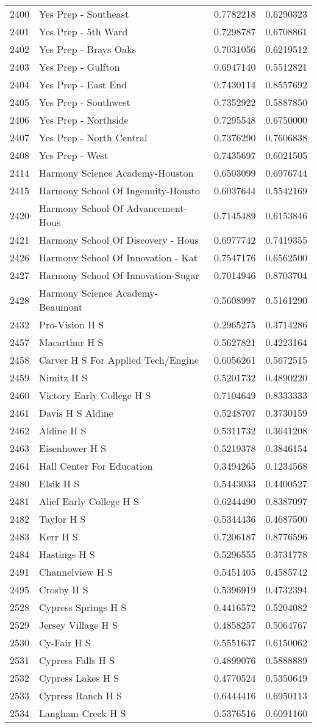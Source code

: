 \documentclass[
]{article}
\begin{document}
\begin{longtable}[]{@{}llrr@{}}
2400 & Yes Prep - Southeast & 0.7782218 & 0.6290323\tabularnewline
2401 & Yes Prep - 5th Ward & 0.7298787 & 0.6708861\tabularnewline
2402 & Yes Prep - Brays Oaks & 0.7031056 & 0.6219512\tabularnewline
2403 & Yes Prep - Gulfton & 0.6947140 & 0.5512821\tabularnewline
2404 & Yes Prep - East End & 0.7430114 & 0.8557692\tabularnewline
2405 & Yes Prep - Southwest & 0.7352922 & 0.5887850\tabularnewline
2406 & Yes Prep - Northside & 0.7295548 & 0.6750000\tabularnewline
2407 & Yes Prep - North Central & 0.7376290 & 0.7606838\tabularnewline
2408 & Yes Prep - West & 0.7435697 & 0.6021505\tabularnewline
2414 & Harmony Science Academy-Houston & 0.6503099 &
0.6976744\tabularnewline
2415 & Harmony School Of Ingenuity-Housto & 0.6037644 &
0.5542169\tabularnewline
2420 & Harmony School Of Advancement-Hous & 0.7145489 &
0.6153846\tabularnewline
2421 & Harmony School Of Discovery - Hous & 0.6977742 &
0.7419355\tabularnewline
2426 & Harmony School Of Innovation - Kat & 0.7547176 &
0.6562500\tabularnewline
2427 & Harmony School Of Innovation-Sugar & 0.7014946 &
0.8703704\tabularnewline
2428 & Harmony Science Academy- Beaumont & 0.5608997 &
0.5161290\tabularnewline
2432 & Pro-Vision H S & 0.2965275 & 0.3714286\tabularnewline
2457 & Macarthur H S & 0.5627821 & 0.4223164\tabularnewline
2458 & Carver H S For Applied Tech/Engine & 0.6056261 &
0.5672515\tabularnewline
2459 & Nimitz H S & 0.5201732 & 0.4890220\tabularnewline
2460 & Victory Early College H S & 0.7104649 & 0.8333333\tabularnewline
2461 & Davis H S Aldine & 0.5248707 & 0.3730159\tabularnewline
2462 & Aldine H S & 0.5311732 & 0.3641208\tabularnewline
2463 & Eisenhower H S & 0.5219378 & 0.3846154\tabularnewline
2464 & Hall Center For Education & 0.3494265 & 0.1234568\tabularnewline
2480 & Elsik H S & 0.5443033 & 0.4400527\tabularnewline
2481 & Alief Early College H S & 0.6244490 & 0.8387097\tabularnewline
2482 & Taylor H S & 0.5344436 & 0.4687500\tabularnewline
2483 & Kerr H S & 0.7206187 & 0.8776596\tabularnewline
2484 & Hastings H S & 0.5296555 & 0.3731778\tabularnewline
2491 & Channelview H S & 0.5451405 & 0.4585742\tabularnewline
2495 & Crosby H S & 0.5396919 & 0.4732394\tabularnewline
2528 & Cypress Springs H S & 0.4416572 & 0.5204082\tabularnewline
2529 & Jersey Village H S & 0.4858257 & 0.5064767\tabularnewline
2530 & Cy-Fair H S & 0.5551637 & 0.6150062\tabularnewline
2531 & Cypress Falls H S & 0.4899076 & 0.5888889\tabularnewline
2532 & Cypress Lakes H S & 0.4770524 & 0.5350649\tabularnewline
2533 & Cypress Ranch H S & 0.6444416 & 0.6950113\tabularnewline
2534 & Langham Creek H S & 0.5376516 & 0.6091160\tabularnewline

\end{longtable}
\end{document}
